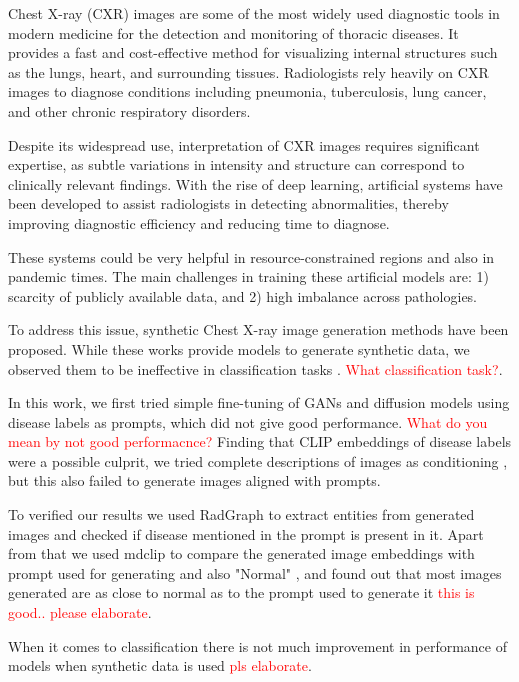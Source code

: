 Chest X-ray (CXR) images are some of the most widely used diagnostic tools in modern medicine for the detection and monitoring of thoracic diseases. 
It provides a fast and cost-effective method for visualizing internal structures such as the lungs, heart, and surrounding tissues. 
Radiologists rely heavily on CXR images to diagnose conditions including pneumonia, tuberculosis, lung cancer, and other chronic respiratory disorders.

Despite its widespread use, interpretation of CXR images requires significant expertise, as subtle variations in intensity and structure can 
correspond to clinically relevant findings. With the rise of deep learning, artificial systems have been developed to assist radiologists in 
detecting abnormalities, thereby improving diagnostic efficiency and reducing time to diagnose.

These systems could be very helpful in resource-constrained regions and also in pandemic times. The main challenges in training these artificial models are: 
1) scarcity of publicly available data, and 
2) high imbalance across pathologies. 

To address this issue, synthetic Chest X-ray image generation methods have been proposed. 
While these works provide models to generate synthetic data, we observed them to be ineffective in classification tasks \cite{andrewng_paper}. \textcolor{red}{What classification task?}.

In this work, we first tried simple fine-tuning of GANs and diffusion models using disease labels as prompts, which did not give good performance. \textcolor{red}{What do you mean by not good performacnce?}
Finding that CLIP embeddings of disease labels were a possible culprit, we tried complete descriptions of images as conditioning \cite{}, 
but this also failed to generate images aligned with prompts.  

To verified our results we used RadGraph to extract entities from generated images and checked if disease mentioned in the prompt is present in it.
Apart from that we used mdclip to compare the generated image embeddings with prompt used for generating and also "Normal" , and found out that 
most images generated are as close to normal as to the prompt used to generate it \textcolor{red}{this is good.. please elaborate}.

When it comes to classification there is not much improvement in performance of models when synthetic data is used \textcolor{red}{pls elaborate}.


